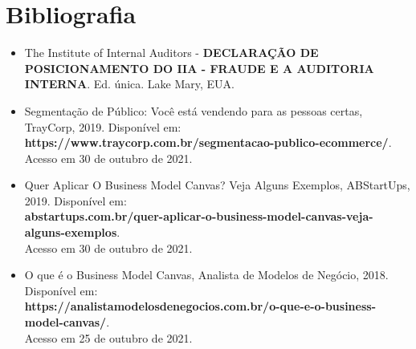 \documentclass[a4paper]{article}
\begin{document}
\section{Bibliografia}
\begin{itemize}
    \item The Institute of Internal Auditors - \textbf{DECLARAÇÃO DE POSICIONAMENTO DO IIA - FRAUDE E A AUDITORIA INTERNA}. Ed. única. Lake Mary, EUA.

    \item Segmentação de Público: Você está vendendo para as pessoas certas, TrayCorp, 2019. Disponível em: \textbf{\\https://www.traycorp.com.br/segmentacao-publico-ecommerce/}. 
    \\Acesso em 30 de outubro de 2021.
    
    \item Quer Aplicar O Business Model Canvas? Veja Alguns Exemplos, ABStartUps, 2019. Disponível em: \textbf{\\abstartups.com.br/quer-aplicar-o-business-model-canvas-veja-alguns-exemplos}. 
    \\Acesso em 30 de outubro de 2021.
    
    \item O que é o Business Model Canvas, Analista de Modelos de Negócio, 2018. Disponível em: \textbf{\\ https://analistamodelosdenegocios.com.br/o-que-e-o-business-model-canvas/}.
    \\Acesso em 25 de outubro de 2021.
\end{itemize}
\end{document}
